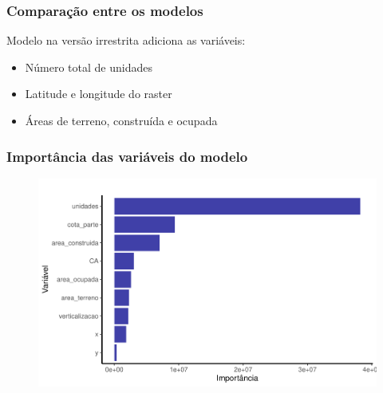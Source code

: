 \documentclass[%
    9pt, 
    aspectratio=169,
]{beamer}
\begin{document}
\begin{frame}
    \frametitle{Comparação entre os modelos}

    \begin{table}
        \centering
    \end{table}
    
    \vspace{25pt}

    Modelo na versão irrestrita adiciona as variáveis: 
    \begin{itemize}
        \item Número total de unidades
        \item Latitude e longitude do raster
        \item Áreas de terreno, construída e ocupada

    \end{itemize}
\end{frame}

\begin{frame}
    \frametitle{Importância das variáveis do modelo}
    \begin{figure}
        \includegraphics[width = .8\textwidth]{imagens/var_importance.pdf}
    \end{figure}
\end{frame}
\end{document}
